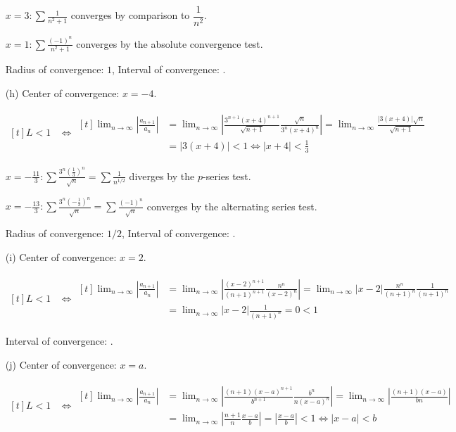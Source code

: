 \documentclass[preview, margin=0.6in]{standalone}
\begin{document}
\begin{itemize}
	$\displaystyle x=3: \sum \frac{1}{n^2+1}$ converges by comparison to $\dfrac{1}{n^2}$.

	$\displaystyle x=1: \sum \frac{(-1)^n}{n^2+1}$ converges by the absolute convergence test.

	Radius of convergence: $1$, Interval of convergence: \boxed{[1,3]}.

\item[(h)]
	Center of convergence: $x=-4$.

	$\begin{aligned}[t]
		L<1
		&\iff 
		\begin{aligned}[t]
			\lim_{n\to\infty}\left|\frac{a_{n+1}}{a_n}\right|
			&=\lim_{n\to\infty}\left|\frac{3^{n+1}(x+4)^{n+1}}{\sqrt{n+1}}\frac{\sqrt{n}}{3^n(x+4)^n}\right|
			=\lim_{n\to\infty}\frac{\left|3(x+4)\right|\sqrt{n}}{\sqrt{n+1}} \\
			&=\left|3(x+4)\right|<1
			\iff \left|x+4\right|<\frac13
		\end{aligned}
	\end{aligned}$

	$\displaystyle x=-\frac{11}{3}: \sum \frac{3^n \left(\frac13\right)^n}{\sqrt{n}}=\sum \frac{1}{n^{1/2}}$ diverges by the $p$-series test.

	$\displaystyle x=-\frac{13}{3}: \sum \frac{3^n \left(-\frac13\right)^n}{\sqrt{n}}=\sum \frac{(-1)^n}{\sqrt{n}}$ converges by the alternating series test.

	Radius of convergence: $1/2$, Interval of convergence: \boxed{[-13/3,-11/3)}.

\item[(i)]
	Center of convergence: $x=2$.

	$\begin{aligned}[t]
		L<1
		&\iff 
		\begin{aligned}[t]
			\lim_{n\to\infty}\left|\frac{a_{n+1}}{a_n}\right|
			&=\lim_{n\to\infty}\left|\frac{(x-2)^{n+1}}{(n+1)^{n+1}}\frac{n^n}{(x-2)^n}\right|
			=\lim_{n\to\infty}\left|x-2\right|\frac{n^n}{(n+1)^n}\frac{1}{(n+1)^n} \\
			&=\lim_{n\to\infty}\left|x-2\right|\frac{1}{(n+1)^n}
			=0<1
		\end{aligned}
	\end{aligned}$

	Interval of convergence: \boxed{(-\infty,\infty)}.

\item[(j)]
	Center of convergence: $x=a$.

	$\begin{aligned}[t]
		L<1
		&\iff 
		\begin{aligned}[t]
			\lim_{n\to\infty}\left|\frac{a_{n+1}}{a_n}\right|
			&=\lim_{n\to\infty}\left|\frac{(n+1)(x-a)^{n+1}}{b^{n+1}}\frac{b^n}{n(x-a)^n}\right|
			=\lim_{n\to\infty}\left|\frac{(n+1)(x-a)}{bn}\right| \\
			&=\lim_{n\to\infty}\left|\frac{n+1}{n}\frac{x-a}{b}\right|
			=\left|\frac{x-a}{b}\right|<1
			\iff \left|x-a\right|<b
		\end{aligned}
	\end{aligned}$


\end{itemize}
\end{document}
